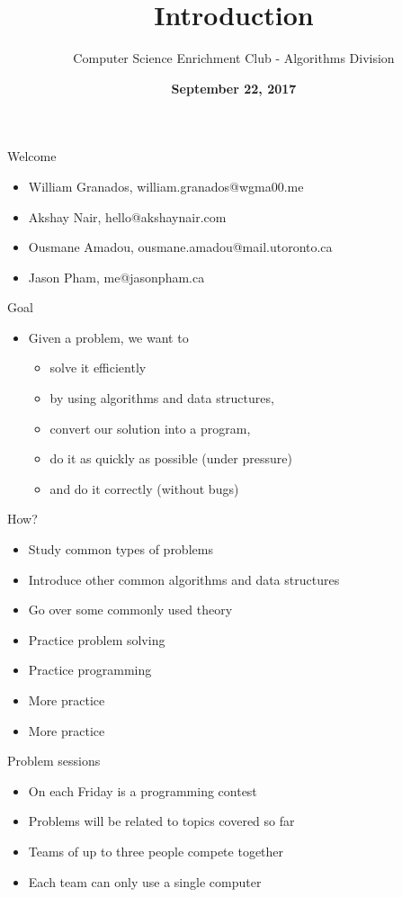 \documentclass[10pt]{beamer}
\title{Introduction}
\author{Computer Science Enrichment Club - Algorithms Division}
\institute{Department of Computer Science \\[2pt] University of Toronto Scarborough}
\date{\textbf{September 22, 2017}}
\newcommand{\bi}{\begin{itemize}}
\newcommand{\ei}{\end{itemize}}
\begin{document}
\maketitle

\begin{frame}{Welcome}
    \bi
        \item William Granados, {\alert{william.granados@wgma00.me}}
        \item Akshay Nair, {\alert{hello@akshaynair.com}}
        \item Ousmane Amadou, {\alert{ousmane.amadou@mail.utoronto.ca}}
        \item Jason Pham, {\alert{me@jasonpham.ca}}
    \ei
\end{frame}

\begin{frame}{Goal}
    \bi
        \item Given a problem, we want to
            \bi
                \item solve it efficiently
                \item by using algorithms and data structures,
                \item convert our solution into a program,
                \item do it as quickly as possible (under pressure)
                \item and do it correctly (without bugs)
            \ei
    \ei
\end{frame}

\begin{frame}{How?}
    \bi
        \item Study common types of problems
        \item Introduce other common algorithms and data structures
        \item Go over some commonly used theory
        \item Practice problem solving
        \item Practice programming
        \item More practice
        \item More practice
    \ei
\end{frame}


\begin{frame}{Problem sessions}
    \bi
        \item On each Friday is a programming contest
        \item Problems will be related to topics covered so far
        \item Teams of up to three people compete together
        \item Each team can only use a single computer
    \ei
\end{frame}
\end{document}
